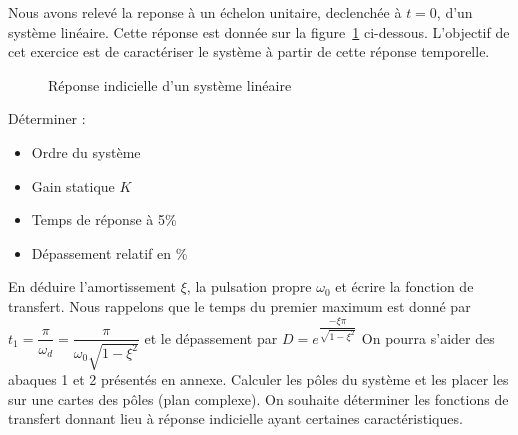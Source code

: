 Nous avons relevé la reponse à un échelon unitaire, 
declenchée à $t=0$, d'un système linéaire.
Cette réponse est donnée sur la figure~\ref{fig-2nd} ci-dessous.
L'objectif de cet exercice est de caractériser le système 
à partir de cette réponse temporelle.
\begin{figure}[!h]
    \centering
    
    \caption{Réponse indicielle d'un système linéaire\label{fig-2nd}}
\end{figure}
\question{}
Déterminer :
\begin{itemize}
    \item Ordre du système
    \item Gain statique $K$
    \item Temps de réponse à 5\%
    \item Dépassement relatif en \%
\end{itemize}
\question{}
En déduire l'amortissement $\xi$, la pulsation propre $\omega_0$ et écrire 
la fonction de transfert. Nous rappelons que le temps du premier maximum est 
donné par $t_1=\dfrac{\pi}{\omega_d}=\dfrac{\pi}{\omega_0\sqrt{1-\xi^2}}$
et le dépassement par $D=e^{\dfrac{-\xi\pi}{\sqrt{1-\xi^2}}}$
On pourra s'aider des abaques 1 et 2 présentés en annexe.
\question{}
Calculer les pôles du système et les placer les sur une cartes des 
pôles (plan complexe).
On souhaite déterminer les fonctions de transfert donnant lieu à réponse indicielle 
ayant certaines caractéristiques.


